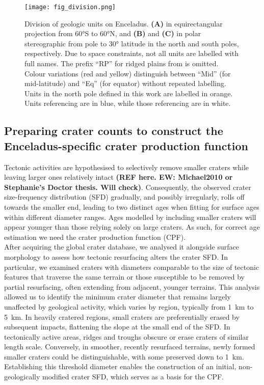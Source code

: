 \documentclass[preprint,12pt,3p,times,authoryear]{elsarticle}
\begin{document}
\begin{figure}[ht!]
    \centering
    \texttt{[image: fig\_division.png]}
    \caption{Division of geologic units on Enceladus. \textbf{(A)} in equirectangular projection from  60°S to  60°N, and \textbf{(B)} and \textbf{(C)}  in polar stereographic from pole to 30° latitude in the north and south poles, respectively. Due to space constraints, not all units are labelled with full names. The prefix “RP” for ridged plains from \citet{Kirchoff2009} is omitted. Colour variations (red and yellow) distinguish between “Mid” (for mid-latitude) and “Eq” (for equator) without repeated labelling. Units in the north pole defined in this work are labelled in orange. Units referencing \citet{Kirchoff2009} are in blue, while those referencing \citet{CrowWillard2015} are in white. }
    \label{fig:division}
\end{figure}

\subsection{Preparing crater counts to construct the Enceladus-specific crater production function}
\label{subsec:cpf}
Tectonic activities are hypothesised to selectively remove smaller craters while leaving larger ones
relatively intact {\bf (REF here. EW: Michael2010 or Stephanie's Doctor thesis. Will check)}. Consequently, the observed crater size-frequency distribution (SFD) gradually, and possibly irregularly, rolls off towards the smaller end, leading to two distinct ages when fitting for surface ages within different diameter ranges. Ages modelled by including smaller craters will appear younger than those relying solely on large craters. As such, for correct age estimation we need the crater production function (CPF).\\

After acquiring the global crater database, we analysed it alongside surface morphology to assess how tectonic resurfacing alters the crater SFD. In particular, we examined craters with diameters comparable to the size of tectonic features that traverse the same terrain or those susceptible to be removed by partial resurfacing, often extending from adjacent, younger terrains. This analysis allowed us to identify the minimum crater diameter that remains largely unaffected by geological activity, which varies by region, typically from 1~km to 5~km. In heavily cratered regions, small craters are preferentially erased by subsequent impacts, flattening the slope at the small end of the SFD. In tectonically active areas, ridges and troughs obscure or erase craters of similar length scale. Conversely, in smoother, recently resurfaced terrains, newly formed smaller craters could be distinguishable, with some preserved down to 1~km. Establishing this threshold diameter enables the construction of an initial, non-geologically modified crater SFD, which serves as a basis for the CPF.\\
\end{document}
